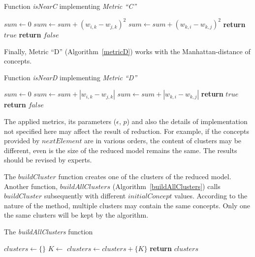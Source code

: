 \documentclass[graybox]{svmult}
\begin{document}
\begin{algorithm}
  \caption{Function \emph{isNearC} implementing \emph{Metric ``C''}}\label{metricC}
  \begin{algorithmic}[1]
      \State $sum \gets 0$
          \State $sum \gets sum + (w_{i, k} - w_{j, k})^2$
          \State $sum \gets sum + (w_{k, i} - w_{k, j})^2$
        \EndIf
      \EndFor
        \State \textbf{return} $true$
      \Else
        \State \textbf{return} $false$
      \EndIf
    \EndFunction
  \end{algorithmic}
\end{algorithm}

Finally, Metric ``D'' (Algorithm~\ref{metricD}) works with the Manhattan-distance of concepts.

\begin{algorithm}
  \caption{Function \emph{isNearD} implementing \emph{Metric ``D''}}\label{metricD}
  \begin{algorithmic}[1]
      \State $sum \gets 0$
          \State $sum \gets sum + |w_{i, k} - w_{j, k}|$
          \State $sum \gets sum + |w_{k, i} - w_{k, j}|$
        \EndIf
      \EndFor
        \State \textbf{return} $true$
      \Else
        \State \textbf{return} $false$
      \EndIf
    \EndFunction
  \end{algorithmic}
\end{algorithm}

The applied metrics, its parameters ($\epsilon$, $p$) and also the details of implementation not specified here may affect the result of reduction. For example, if the concepts provided by $nextElement$ are in various orders, the content of clusters may be different, even is the size of the reduced model remains the same. The results should be revised by experts.

The $buildCluster$ function creates one of the clusters of the reduced model. Another function, $buildAllClusters$ (Algorithm~\ref{buildAllClusters}) calls $buildCluster$ subsequently with different $initialConcept$ values. According to the nature of the method, multiple clusters may contain the same concepts. Only one the same clusters will be kept by the algorithm.

\begin{algorithm}
  \caption{The \emph{buildAllClusters} function}\label{buildAllClusters}
  \begin{algorithmic}[1]
      \State $clusters \gets \{\}$
        \State $K \gets$ 
          \State $clusters \gets clusters + \{K\}$
        \EndIf
      \EndFor
      \State \textbf{return} $clusters$
    \EndFunction
  \end{algorithmic}
\end{algorithm}
\end{document}
